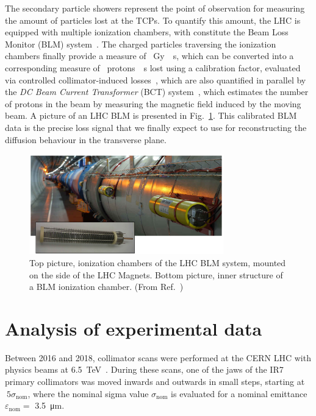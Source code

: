 The secondary particle showers represent the point of observation for measuring the amount of particles lost at the TCPs. To quantify this amount, the LHC is equipped with multiple ionization chambers, with constitute the Beam Loss Monitor (BLM) system~\cite{blmSystem1, blmSystem2}. The charged particles traversing the ionization chambers finally provide a measure of \SI{}{Gy \per s}, which can be converted into a corresponding measure of \SI{}{protons \per s} lost using a calibration factor, evaluated via controlled collimator-induced losses~\cite{arek}, which are also quantified in parallel by the \textit{DC Beam Current Transformer} (BCT) system~\cite{Denard:1213275}, which estimates the number of protons in the beam by measuring the magnetic field induced by the moving beam. A picture of an LHC BLM is presented in Fig.~\ref{fig:blm}. This calibrated BLM data is the precise loss signal that we finally expect to use for reconstructing the diffusion behaviour in the transverse plane.

\begin{figure}[hpt]
    \centering
    \includegraphics[width=0.75\textwidth]{5_Diffusion_measurement_LHC/figs/blm.png}
    \caption{Top picture, ionization chambers of the LHC BLM system, mounted on the side of the LHC Magnets. Bottom picture, inner structure of a BLM ionization chamber. (From Ref.~\cite{blmonline})}
    \label{fig:blm}
\end{figure}


%
\section{Analysis of experimental data}
%

Between 2016 and 2018, collimator scans were performed at the CERN LHC with physics beams at \SI{6.5}{TeV}~\cite{PhysRevAccelBeams.23.044802}. During these scans, one of the jaws of the IR7 primary collimators was moved inwards and outwards in small steps, starting at $~5\sigma_\text{nom}$, where the nominal sigma value $\sigma_\text{nom}$ is evaluated for a nominal emittance $\varepsilon_\text{nom} =$ \SI{3.5}{\micro\meter}.

